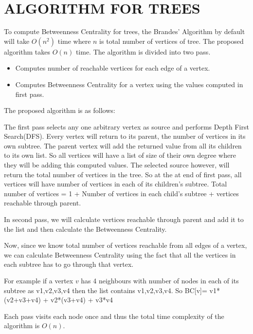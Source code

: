 \documentclass[MTech]{iitmdiss}
\begin{document}
\chapter{ALGORITHM FOR TREES}
To compute Betweenness Centrality for trees, the Brandes' Algorithm by default will take $O(n^2)$ time where $n$ is total number of vertices of tree.
The proposed algorithm takes $O(n)$ time.
The algorithm is divided into two pass.
\vspace{1em}

\begin{itemize}

  \item Computes number of reachable vertices for each edge of a vertex.
  \item Computes Betweenness Centrality for a vertex using the values computed in first pass.
\end{itemize}

The proposed algorithm is as follows:

The first pass selects any one arbitrary vertex as source and performs Depth First Search(DFS). Every vertex will return to its parent, the number of vertices in its own subtree. The parent vertex will add the returned value from all its children to its own list. So all vertices will have a list of size of their own degree where they will be adding this computed values. The selected source however, will return the total number of vertices in the tree.
So at the at end of first pass, all vertices will have number of vertices in each of its children's subtree.
Total number of vertices = 1 + Number of vertices in each child's subtree + vertices reachable through parent.

In second pass, we will calculate vertices reachable through parent and add it to the list and then calculate the Betweenness Centrality.

Now, since we know total number of vertices reachable from all edges of a vertex, we can calculate Betweenness Centrality using the fact that all the vertices in each subtree has to go through that vertex.



For example if a vertex $v$ has 4 neighbours with number of nodes in each of its subtree as v1,v2,v3,v4 then the list contains v1,v2,v3,v4.
So BC[v]= v1*(v2+v3+v4) + v2*(v3+v4) + v3*v4

Each pass visits each node once and thus the total time complexity of the algorithm is $O(n)$.
\end{document}
